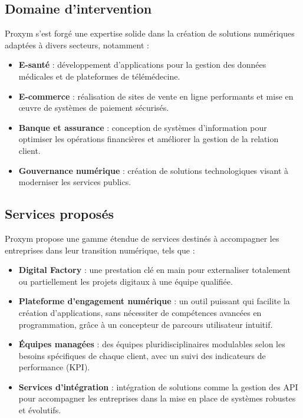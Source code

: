 \documentclass[12pt,a4paper]{report}
\begin{document}
\subsection{Domaine d’intervention}
Proxym s’est forgé une expertise solide dans la création de solutions numériques adaptées à divers secteurs, notamment :
\begin{itemize}
    \item \textbf{E-santé} : développement d'applications pour la gestion des données médicales et de plateformes de télémédecine.
    \item \textbf{E-commerce} : réalisation de sites de vente en ligne performants et mise en œuvre de systèmes de paiement sécurisés.
    \item \textbf{Banque et assurance} : conception de systèmes d’information pour optimiser les opérations financières et améliorer la gestion de la relation client.
    \item \textbf{Gouvernance numérique} : création de solutions technologiques visant à moderniser les services publics.
\end{itemize}

\subsection{Services proposés}
Proxym propose une gamme étendue de services destinés à accompagner les entreprises dans leur transition numérique, tels que :
\begin{itemize}
    \item \textbf{Digital Factory} : une prestation clé en main pour externaliser totalement ou partiellement les projets digitaux à une équipe qualifiée.
    \item \textbf{Plateforme d’engagement numérique} : un outil puissant qui facilite la création d’applications, sans nécessiter de compétences avancées en programmation, grâce à un concepteur de parcours utilisateur intuitif.
    \item \textbf{Équipes managées} : des équipes pluridisciplinaires modulables selon les besoins spécifiques de chaque client, avec un suivi des indicateurs de performance (KPI).
    \item \textbf{Services d’intégration} : intégration de solutions comme la gestion des API pour accompagner les entreprises dans la mise en place de systèmes robustes et évolutifs.
\end{itemize}
\end{document}
